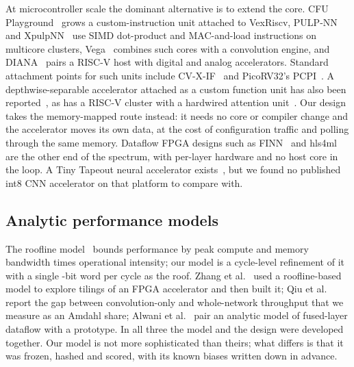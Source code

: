 \documentclass[journal]{IEEEtran}
\begin{document}
At microcontroller scale the dominant alternative is to extend the core. CFU Playground~\cite{prakash2023cfu} grows a custom-instruction unit attached to VexRiscv, PULP-NN~\cite{garofalo2019pulpnn} and XpulpNN~\cite{garofalo2020xpulpnn} use SIMD dot-product and MAC-and-load instructions on multicore clusters, Vega~\cite{rossi2021vega} combines such cores with a convolution engine, and DIANA~\cite{houshmand2023diana} pairs a RISC-V host with digital and analog accelerators. Standard attachment points for such units include CV-X-IF~\cite{cvxif} and PicoRV32's PCPI~\cite{picorv32}. A depthwise-separable accelerator attached as a custom function unit has also been reported~\cite{yildirim2025dsc}, as has a RISC-V cluster with a hardwired attention unit~\cite{wiese2024attention}. Our design takes the memory-mapped route instead: it needs no core or compiler change and the accelerator moves its own data, at the cost of configuration traffic and polling through the same memory. Dataflow FPGA designs such as FINN~\cite{umuroglu2017finn} and hls4ml~\cite{duarte2018hls4ml} are the other end of the spectrum, with per-layer hardware and no host core in the loop. A Tiny Tapeout neural accelerator exists~\cite{tinytapeout678}, but we found no published int8 CNN accelerator on that platform to compare with.

\subsection{Analytic performance models}
The roofline model~\cite{williams2009roofline} bounds performance by peak compute and memory bandwidth times operational intensity; our model is a cycle-level refinement of it with a single \PortBits-bit word per cycle as the roof. Zhang et al.~\cite{zhang2015optimizing} used a roofline-based model to explore tilings of an FPGA accelerator and then built it; Qiu et al.~\cite{qiu2016going} report the gap between convolution-only and whole-network throughput that we measure as an Amdahl share; Alwani et al.~\cite{alwani2016fused} pair an analytic model of fused-layer dataflow with a prototype. In all three the model and the design were developed together. Our model is not more sophisticated than theirs; what differs is that it was frozen, hashed and scored, with its known biases written down in advance.
\end{document}
